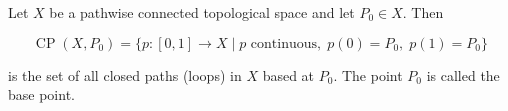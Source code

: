 Let $X$ be a pathwise connected topological space and let $P_0 \in X$. Then

$$\operatorname{CP}(X, P_0) = \{ p: [0,1] \to X \mid p \text{ continuous}, \; p(0) = P_0, \; p(1) = P_0 \}$$

is the set of all closed paths (loops) in $X$ based at $P_0$. The point $P_0$ is called the base point.
